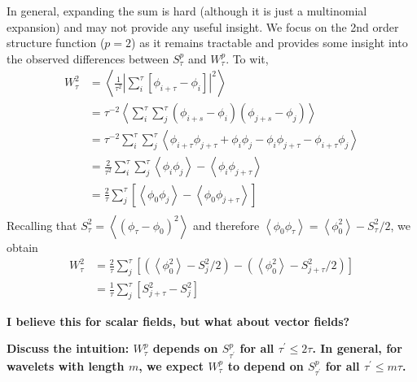 \documentclass{article}
\begin{document}
In general, expanding the sum is hard (although it is just a multinomial expansion) and may not provide any useful insight.
We focus on the 2nd order structure function ($p=2$) as it remains tractable and provides some insight into the observed differences between $S^p_\tau$ and $W^p_\tau$.
To wit,
\begin{align}
    W^2_\tau
        & = \left< \frac{1}{\tau^2} \left| \sum\limits_{i}^{\tau} \left[\phi_{i+\tau} - \phi_{i}\right] \right|^2\right> \\
        & = \tau^{-2} \left< \sum\limits_{i}^{\tau} \sum\limits_{j}^{\tau} (\phi_{i+s} - \phi_i)(\phi_{j+s} - \phi_j) \right> \\
        & = \tau^{-2} \sum\limits_{i}^{\tau} \sum\limits_{j}^{\tau} \left< \phi_{i+\tau}\phi_{j+\tau} + \phi_{i}\phi_{j} - \phi_{i}\phi_{j+\tau} - \phi_{i+\tau}\phi_{j}\right> \\
        & = \frac{2}{\tau^2} \sum\limits_{i}^{\tau} \sum\limits_{j}^{\tau} \left<\phi_i \phi_j\right> - \left<\phi_i \phi_{j+\tau}\right> \\
        & = \frac{2}{\tau} \sum\limits_{j}^{\tau} \left[ \left<\phi_0 \phi_j\right> - \left<\phi_0 \phi_{j+\tau}\right> \right] \\
\end{align}
Recalling that $S^2_\tau = \left<(\phi_\tau - \phi_0)^2\right>$ and therefore $\left<\phi_0 \phi_\tau\right> = \left<\phi_0^2\right> - S^2_\tau/2$,
we obtain
\begin{align}
    W^2_\tau
        & = \frac{2}{\tau}\sum\limits_j^\tau \left[ \left(\left<\phi_0^2\right> - S^2_j/2\right) - \left(\left<\phi_0^2\right> - S^2_{j+\tau}/2\right)\right] \\
        & = \frac{1}{\tau} \sum\limits_j^\tau \left[ S^2_{j+\tau} - S^2_j \right]
\end{align}

\textbf{
I believe this for scalar fields, but what about vector fields?
}

\textbf{
Discuss the intuition: $W^p_\tau$ depends on $S^p_{\tau^\prime}$ for all $\tau^\prime \leq 2\tau$.
In general, for wavelets with length $m$, we expect $W^p_\tau$ to depend on $S^p_{\tau^\prime}$ for all $\tau^\prime \leq m \tau$.
}

\end{document}
